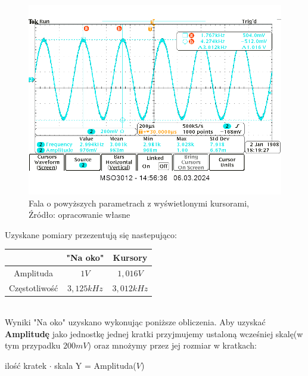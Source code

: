 \documentclass{article}
\begin{document}
        \begin{figure}[!ht]
          \begin{center}
              \includegraphics[scale=0.4]{grafiki/sin_kursory.png}
              \caption{Fala o powyższych parametrach z wyświetlonymi kursorami,\\Źródło: opracowanie własne}
          \end{center}
        \end{figure}

        Uzyskane pomiary przezentują się nastepująco:\\

        \begin{tabular}{|c|c|c|}
          \hline
          & "{}Na oko"{} & Kursory \\
          \hline
          Amplituda & $1V$ & $1,016V$ \\
          \hline
          Częstotliwość & $3,125kHz$ & $3,012kHz$ \\
          \hline
        \end{tabular} \\

        Wyniki "{}Na oko"{} uzyskano wykonując poniższe obliczenia. Aby uzyskać \textbf{Amplitudę} jako jednostkę jednej kratki przyjmujemy ustaloną wcześniej skalę(w tym przypadku $200mV$) oraz mnożymy przez jej rozmiar w kratkach:

        \begin{center}
          ilość kratek $\cdot$ skala Y = Amplituda($V$)
        \end{center}
\end{document}
